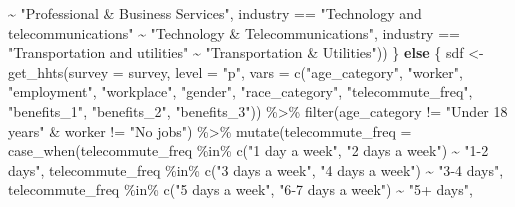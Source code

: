 \documentclass[
  12pt,
]{article}
\newenvironment{Shaded}{\begin{snugshade}}{\end{snugshade}}
\newcommand{\AttributeTok}[1]{\textcolor[rgb]{0.77,0.63,0.00}{#1}}
\newcommand{\ControlFlowTok}[1]{\textcolor[rgb]{0.13,0.29,0.53}{\textbf{#1}}}
\newcommand{\FunctionTok}[1]{\textcolor[rgb]{0.00,0.00,0.00}{#1}}
\newcommand{\NormalTok}[1]{#1}
\newcommand{\OtherTok}[1]{\textcolor[rgb]{0.56,0.35,0.01}{#1}}
\newcommand{\SpecialCharTok}[1]{\textcolor[rgb]{0.00,0.00,0.00}{#1}}
\newcommand{\StringTok}[1]{\textcolor[rgb]{0.31,0.60,0.02}{#1}}
\begin{document}
\begin{Shaded}
\begin{Highlighting}[]
          \SpecialCharTok{\textasciitilde{}} \StringTok{"Professional \& Business Services"}\NormalTok{,}
\NormalTok{        industry }\SpecialCharTok{==} \StringTok{"Technology and telecommunications"}
          \SpecialCharTok{\textasciitilde{}} \StringTok{"Technology \& Telecommunications"}\NormalTok{,}
\NormalTok{        industry }\SpecialCharTok{==} \StringTok{"Transportation and utilities"}
          \SpecialCharTok{\textasciitilde{}} \StringTok{"Transportation \& Utilities"}\NormalTok{))}
\NormalTok{  \} }\ControlFlowTok{else}\NormalTok{ \{}
\NormalTok{    sdf }\OtherTok{\textless{}{-}} \FunctionTok{get\_hhts}\NormalTok{(}\AttributeTok{survey =}\NormalTok{ survey,}
                    \AttributeTok{level =} \StringTok{"p"}\NormalTok{,}
                    \AttributeTok{vars =} \FunctionTok{c}\NormalTok{(}\StringTok{"age\_category"}\NormalTok{,}
                             \StringTok{"worker"}\NormalTok{,}
                             \StringTok{"employment"}\NormalTok{,}
                             \StringTok{"workplace"}\NormalTok{,}
                             \StringTok{"gender"}\NormalTok{,}
                             \StringTok{"race\_category"}\NormalTok{,}
                             \StringTok{"telecommute\_freq"}\NormalTok{,}
                             \StringTok{"benefits\_1"}\NormalTok{,}
                             \StringTok{"benefits\_2"}\NormalTok{,}
                             \StringTok{"benefits\_3"}\NormalTok{)) }\SpecialCharTok{\%\textgreater{}\%} 
      \FunctionTok{filter}\NormalTok{(age\_category }\SpecialCharTok{!=} \StringTok{"Under 18 years"}
             \SpecialCharTok{\&}\NormalTok{ worker }\SpecialCharTok{!=} \StringTok{"No jobs"}\NormalTok{) }\SpecialCharTok{\%\textgreater{}\%} 
      \FunctionTok{mutate}\NormalTok{(}\AttributeTok{telecommute\_freq =} \FunctionTok{case\_when}\NormalTok{(telecommute\_freq }\SpecialCharTok{\%in\%} \FunctionTok{c}\NormalTok{(}\StringTok{"1 day a week"}\NormalTok{, }\StringTok{"2 days a week"}\NormalTok{) }\SpecialCharTok{\textasciitilde{}} \StringTok{"1{-}2 days"}\NormalTok{, }
\NormalTok{                                          telecommute\_freq }\SpecialCharTok{\%in\%} \FunctionTok{c}\NormalTok{(}\StringTok{"3 days a week"}\NormalTok{, }\StringTok{"4 days a week"}\NormalTok{) }\SpecialCharTok{\textasciitilde{}} \StringTok{"3{-}4 days"}\NormalTok{, }
\NormalTok{                                          telecommute\_freq }\SpecialCharTok{\%in\%} \FunctionTok{c}\NormalTok{(}\StringTok{"5 days a week"}\NormalTok{, }\StringTok{"6{-}7 days a week"}\NormalTok{) }\SpecialCharTok{\textasciitilde{}} \StringTok{"5+ days"}\NormalTok{,}

\end{Highlighting}
\end{Shaded}
\end{document}
